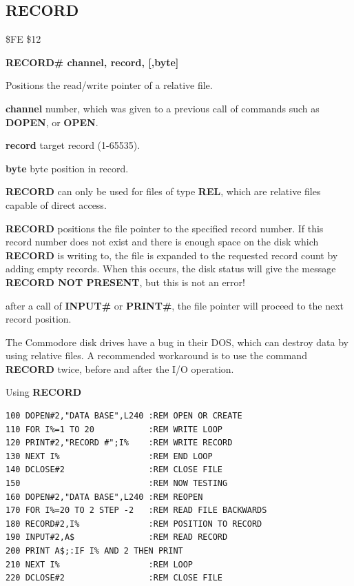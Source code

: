 
\newpage
\subsection{RECORD}
\begin{description}[leftmargin=2cm,style=nextline]
\item [Token:] \$FE \$12
\item [Format:] {\bf RECORD\# channel, record, [,byte]}
\item [Usage:]  Positions the read/write pointer of a relative file.

                {\bf channel} number, which was given to a previous
                call of commands such as {\bf DOPEN}, or {\bf OPEN}.

                {\bf record} target record (1-65535).

                {\bf byte} byte position in record.

                {\bf RECORD} can only be used for files of
                type {\bf REL}, which are relative files capable
                of direct access.

               {\bf RECORD} positions the file pointer
               to the specified record number. If this record number
               does not exist and there is enough space on the disk
               which {\bf RECORD} is writing to,
               the file is expanded to the requested record count by adding
               empty records. When this occurs, the disk
               status will give the message {\bf RECORD NOT PRESENT}, but
               this is not an error!

               after a call of {\bf INPUT\#} or {\bf PRINT\#}, the file pointer will proceed
               to the next record position.

\item [Remarks:] The Commodore disk drives have a bug
               in their DOS, which can destroy data by using
               relative files. A recommended workaround is to
               use the command {\bf RECORD} twice, before
               and after the I/O operation.

\item [Example:] Using {\bf RECORD}
\begin{tcolorbox}[colback=black,coltext=white]
\verbatimfont{\codefont}
\begin{verbatim}
100 DOPEN#2,"DATA BASE",L240 :REM OPEN OR CREATE
110 FOR I%=1 TO 20           :REM WRITE LOOP
120 PRINT#2,"RECORD #";I%    :REM WRITE RECORD
130 NEXT I%                  :REM END LOOP
140 DCLOSE#2                 :REM CLOSE FILE
150                          :REM NOW TESTING
160 DOPEN#2,"DATA BASE",L240 :REM REOPEN
170 FOR I%=20 TO 2 STEP -2   :REM READ FILE BACKWARDS
180 RECORD#2,I%              :REM POSITION TO RECORD
190 INPUT#2,A$               :REM READ RECORD
200 PRINT A$;:IF I% AND 2 THEN PRINT
210 NEXT I%                  :REM LOOP
220 DCLOSE#2                 :REM CLOSE FILE


\end{verbatim}
\end{tcolorbox}
\end{description}
